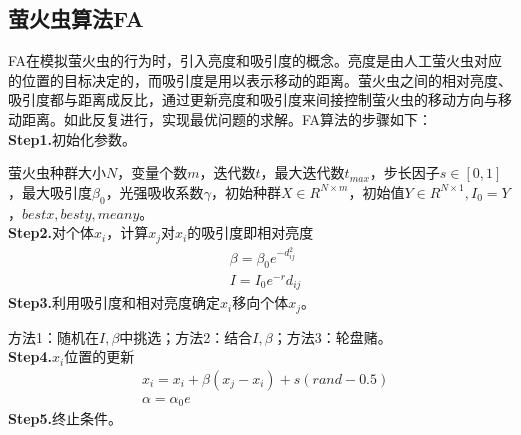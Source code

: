     \subsection{萤火虫算法FA}
        \par
        FA在模拟萤火虫的行为时，引入亮度和吸引度的概念。亮度是由人工萤火虫对应的位置的目标决定的，而吸引度是用以表示移动的距离。萤火虫之间的相对亮度、吸引度都与距离成反比，通过更新亮度和吸引度来间接控制萤火虫的移动方向与移动距离。如此反复进行，实现最优问题的求解。FA算法的步骤如下：\\
        \textbf{Step1.}初始化参数。
        \par
        萤火虫种群大小$N$，变量个数$m$，迭代数$t$，最大迭代数$t_{max}$，步长因子$s\in [0,1]$，最大吸引度$\beta_0$，光强吸收系数$\gamma$，初始种群$X\in R^{N\times m}$，初始值$Y\in R^{N\times 1},I_0 = Y$，$bestx,besty,meany$。\\
        \textbf{Step2.}对个体$x_i$，计算$x_j$对$x_i$的吸引度即相对亮度
        \begin{align*}
        & \beta = \beta_0 e^{-d_{ij}^2}\\
        & I = I_0 e^{-r}d_{ij}
        \end{align*}
        \textbf{Step3.}利用吸引度和相对亮度确定$x_i$移向个体$x_j$。
        \par
        方法1：随机在$I,\beta$中挑选；方法2：结合$I,\beta$；方法3：轮盘赌。\\
        \textbf{Step4.}$x_i$位置的更新
        \begin{align*}
        & x_i = x_i +\beta(x_j-x_i)+s(rand-0.5)\\
        & \alpha = \alpha_0 e
        \end{align*}
        \textbf{Step5.}终止条件。

